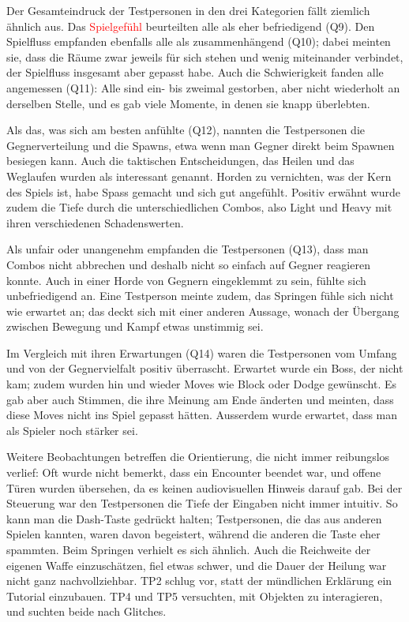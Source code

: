 \documentclass[../Main.tex]{subfiles}
\begin{document}
Der Gesamteindruck der Testpersonen in den drei Kategorien fällt ziemlich ähnlich aus. Das \textcolor{red}{Spielgefühl} beurteilten alle als eher befriedigend (Q9). Den Spielfluss empfanden ebenfalls alle als zusammenhängend (Q10); dabei meinten sie, dass die Räume zwar jeweils für sich stehen und wenig miteinander verbindet, der Spielfluss insgesamt aber gepasst habe. Auch die Schwierigkeit fanden alle angemessen (Q11): Alle sind ein- bis zweimal gestorben, aber nicht wiederholt an derselben Stelle, und es gab viele Momente, in denen sie knapp überlebten.

Als das, was sich am besten anfühlte (Q12), nannten die Testpersonen die Gegnerverteilung und die Spawns, etwa wenn man Gegner direkt beim Spawnen besiegen kann. Auch die taktischen Entscheidungen, das Heilen und das Weglaufen wurden als interessant genannt. Horden zu vernichten, was der Kern des Spiels ist, habe Spass gemacht und sich gut angefühlt. Positiv erwähnt wurde zudem die Tiefe durch die unterschiedlichen Combos, also Light und Heavy mit ihren verschiedenen Schadenswerten.

Als unfair oder unangenehm empfanden die Testpersonen (Q13), dass man Combos nicht abbrechen und deshalb nicht so einfach auf Gegner reagieren konnte. Auch in einer Horde von Gegnern eingeklemmt zu sein, fühlte sich unbefriedigend an. Eine Testperson meinte zudem, das Springen fühle sich nicht wie erwartet an; das deckt sich mit einer anderen Aussage, wonach der Übergang zwischen Bewegung und Kampf etwas unstimmig sei.

Im Vergleich mit ihren Erwartungen (Q14) waren die Testpersonen vom Umfang und von der Gegnervielfalt positiv überrascht. Erwartet wurde ein Boss, der nicht kam; zudem wurden hin und wieder Moves wie Block oder Dodge gewünscht. Es gab aber auch Stimmen, die ihre Meinung am Ende änderten und meinten, dass diese Moves nicht ins Spiel gepasst hätten. Ausserdem wurde erwartet, dass man als Spieler noch stärker sei.

Weitere Beobachtungen betreffen die Orientierung, die nicht immer reibungslos verlief: Oft wurde nicht bemerkt, dass ein Encounter beendet war, und offene Türen wurden übersehen, da es keinen audiovisuellen Hinweis darauf gab. Bei der Steuerung war den Testpersonen die Tiefe der Eingaben nicht immer intuitiv. So kann man die Dash-Taste gedrückt halten; Testpersonen, die das aus anderen Spielen kannten, waren davon begeistert, während die anderen die Taste eher spammten. Beim Springen verhielt es sich ähnlich. Auch die Reichweite der eigenen Waffe einzuschätzen, fiel etwas schwer, und die Dauer der Heilung war nicht ganz nachvollziehbar. TP2 schlug vor, statt der mündlichen Erklärung ein Tutorial einzubauen. TP4 und TP5 versuchten, mit Objekten zu interagieren, und suchten beide nach Glitches.
\end{document}
